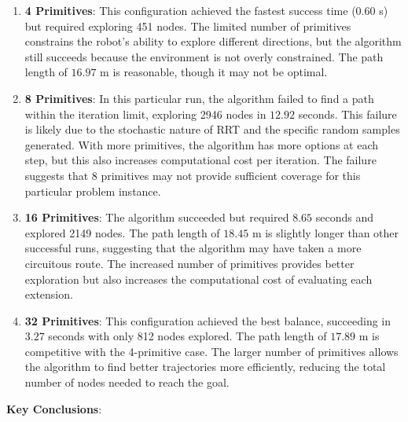 \documentclass[11pt]{article}
\begin{document}
\begin{enumerate}
    \item \textbf{4 Primitives}: This configuration achieved the fastest success time ($0.60$ s) but required exploring 451 nodes. The limited number of primitives constrains the robot's ability to explore different directions, but the algorithm still succeeds because the environment is not overly constrained. The path length of $16.97$ m is reasonable, though it may not be optimal.

    \item \textbf{8 Primitives}: In this particular run, the algorithm failed to find a path within the iteration limit, exploring 2946 nodes in $12.92$ seconds. This failure is likely due to the stochastic nature of RRT and the specific random samples generated. With more primitives, the algorithm has more options at each step, but this also increases computational cost per iteration. The failure suggests that 8 primitives may not provide sufficient coverage for this particular problem instance.

    \item \textbf{16 Primitives}: The algorithm succeeded but required $8.65$ seconds and explored 2149 nodes. The path length of $18.45$ m is slightly longer than other successful runs, suggesting that the algorithm may have taken a more circuitous route. The increased number of primitives provides better exploration but also increases the computational cost of evaluating each extension.

    \item \textbf{32 Primitives}: This configuration achieved the best balance, succeeding in $3.27$ seconds with only 812 nodes explored. The path length of $17.89$ m is competitive with the 4-primitive case. The larger number of primitives allows the algorithm to find better trajectories more efficiently, reducing the total number of nodes needed to reach the goal.
\end{enumerate}

\textbf{Key Conclusions}:
\end{document}
